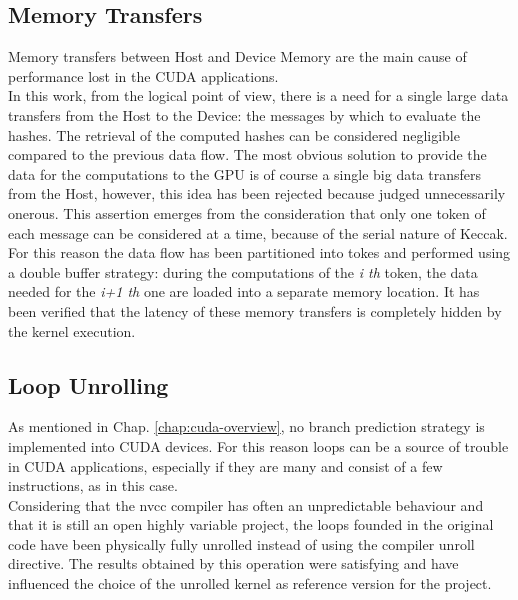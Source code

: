 \subsection{Memory Transfers}
Memory transfers between Host and Device Memory are the main cause of performance lost in the CUDA applications.\\
In this work, from the logical point of view, there is a need for a single large data transfers from the Host to the Device: the messages by which to evaluate the hashes. The retrieval of the computed hashes can be considered negligible compared to the previous data flow. The most obvious solution to provide the data for the computations to the GPU is of course a single big data transfers from the Host, however, this idea has been rejected because judged unnecessarily onerous. This assertion emerges from the consideration that only one token of each message can be considered at a time, because of the serial nature of Keccak. For this reason the data flow has been partitioned into tokes and performed using a double buffer strategy: during the computations of the \textit{i th} token, the data needed for the \textit{i+1 th} one are loaded into a separate memory location. It has been verified that the latency of these memory transfers is completely hidden by the kernel execution.

\subsection{Loop Unrolling}
As mentioned in Chap. \ref{chap:cuda-overview}, no branch prediction strategy is implemented into CUDA devices. For this reason loops can be a source of trouble in CUDA applications, especially if they are many and consist of a few instructions, as in this case.\\
Considering that the nvcc compiler has often an unpredictable behaviour and that it is still an open highly variable project, the loops founded in the original code have been physically fully unrolled instead of using the compiler unroll directive. The results obtained by this operation were satisfying and have influenced the choice of the unrolled kernel as reference version for the project.

